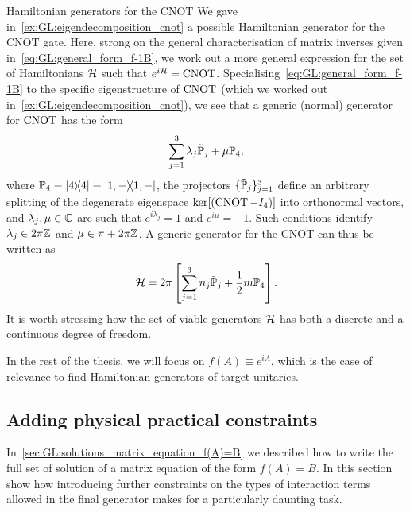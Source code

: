 \begin{examplebox}[label={ex:GL:cnot_generator_decomposition}]{Hamiltonian generators for the CNOT}
\fontsize{10pt}{10pt}\selectfont
We gave in~\cref{ex:GL:eigendecomposition_cnot} a possible Hamiltonian generator for the CNOT gate.
Here, strong on the general characterisation of matrix inverses given in~\cref{eq:GL:general_form_f-1B}, we work out a more general expression for the set of Hamiltonians ${\mathcal{H}}$ such that $e^{i{\mathcal{H}}}=\operatorname{CNOT}$.
Specialising~\cref{eq:GL:general_form_f-1B} to the specific eigenstructure of $\operatorname{CNOT}$ (which we worked out in~\cref{ex:GL:eigendecomposition_cnot}), we see that a generic (normal) generator for $\operatorname{CNOT}$ has the form
\begin{equation}
    \sum_{j=1}^3 \lambda_j \tilde{{\mathbb{P}}}_j + \mu{\mathbb{P}}_4,
\end{equation}
where
${\mathbb{P}}_4\equiv\ketbra 4\equiv\ketbra{1,-}$, the projectors 
$\{\tilde{{\mathbb{P}}}_j\}_{j=1}^3$ define an arbitrary splitting of the degenerate eigenspace $\ker[(\operatorname{CNOT}-I_4)]$ into orthonormal vectors, and $\lambda_j,\mu\in{\mathbb{C}}$ are such that $e^{i\lambda_j}=1$ and $e^{i\mu}=-1$.
Such conditions identify $\lambda_j\in2\pi{\mathbb{Z}}$ and $\mu\in\pi + 2\pi{\mathbb{Z}}$.
A generic generator for the CNOT can thus be written as
\begin{equation}
    {\mathcal{H}} =
    2\pi\left[
    \sum_{j=1}^3 n_j \tilde{{\mathbb{P}}}_j +
    \frac{1}{2} m{\mathbb{P}}_4
    \right].
\end{equation}
It is worth stressing how the set of viable generators ${\mathcal{H}}$ has both a discrete and a continuous degree of freedom.
\end{examplebox}

In the rest of the thesis, we will focus on $f(A)\equiv e^{iA}$, which is the case of relevance to find Hamiltonian generators of target unitaries.

\subsection{Adding physical practical constraints}
\label{sec:GL:constraints_on_interaction_pars}

In~\cref{sec:GL:solutions_matrix_equation_f(A)=B} we described how to write the full set of solution of a matrix equation of the form $f(A)=B$.
In this section show how introducing further constraints on the types of interaction terms allowed in the final generator makes for a particularly daunting task.

